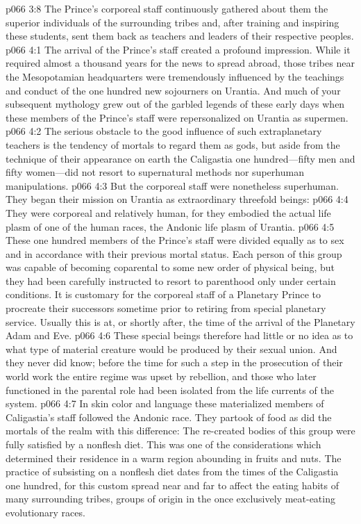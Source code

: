 \vs p066 3:8 The Prince’s corporeal staff continuously gathered about them the superior individuals of the surrounding tribes and, after training and inspiring these students, sent them back as teachers and leaders of their respective peoples.
\vs p066 4:1 The arrival of the Prince’s staff created a profound impression. While it required almost a thousand years for the news to spread abroad, those tribes near the Mesopotamian headquarters were tremendously influenced by the teachings and conduct of the one hundred new sojourners on Urantia. And much of your subsequent mythology grew out of the garbled legends of these early days when these members of the Prince’s staff were repersonalized on Urantia as supermen.
\vs p066 4:2 The serious obstacle to the good influence of such extraplanetary teachers is the tendency of mortals to regard them as gods, but aside from the technique of their appearance on earth the Caligastia one hundred---fifty men and fifty women---did not resort to supernatural methods nor superhuman manipulations.
\vs p066 4:3 But the corporeal staff were nonetheless superhuman. They began their mission on Urantia as extraordinary threefold beings:
\pc \vs p066 4:4 \bibnobreakspace They were corporeal and relatively human, for they embodied the actual life plasm of one of the human races, the Andonic life plasm of Urantia.
\vs p066 4:5 These one hundred members of the Prince’s staff were divided equally as to sex and in accordance with their previous mortal status. Each person of this group was capable of becoming coparental to some new order of physical being, but they had been carefully instructed to resort to parenthood only under certain conditions. It is customary for the corporeal staff of a Planetary Prince to procreate their successors sometime prior to retiring from special planetary service. Usually this is at, or shortly after, the time of the arrival of the Planetary Adam and Eve.
\vs p066 4:6 These special beings therefore had little or no idea as to what type of material creature would be produced by their sexual union. And they never did know; before the time for such a step in the prosecution of their world work the entire regime was upset by rebellion, and those who later functioned in the parental role had been isolated from the life currents of the system.
\vs p066 4:7 In skin color and language these materialized members of Caligastia’s staff followed the Andonic race. They partook of food as did the mortals of the realm with this difference: The re\hyp{}created bodies of this group were fully satisfied by a nonflesh diet. This was one of the considerations which determined their residence in a warm region abounding in fruits and nuts. The practice of subsisting on a nonflesh diet dates from the times of the Caligastia one hundred, for this custom spread near and far to affect the eating habits of many surrounding tribes, groups of origin in the once exclusively meat\hyp{}eating evolutionary races.
